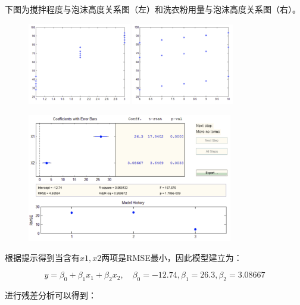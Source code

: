\documentclass{article}
\begin{document}
下图为搅拌程度与泡沫高度关系图（左）和洗衣粉用量与泡沫高度关系图（右）。

\begin{figure}[H]
    \centering
    \includegraphics[width=0.4\textwidth]{pic11.png}
    \includegraphics[width=0.4\textwidth]{pic12.png}
\end{figure}


\begin{figure}[H]
    \centering
    \includegraphics[width=0.8\textwidth]{pic13.png}
\end{figure}

根据提示得到当含有$x1,x2$两项是RMSE最小，因此模型建立为：

$$y=\beta_0+\beta_1x_1+\beta_2x_2,\quad \beta_0=-12.74,\beta_1=26.3,\beta_2=3.08667$$

进行残差分析可以得到：
\end{document}
